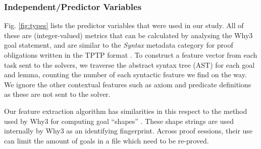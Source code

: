 \subsubsection{Independent/Predictor Variables}
\label{sec:independant}
Fig. \ref{fig:types} lists the predictor variables that were used in our study.  All of these are (integer-valued) metrics that can be calculated by analysing the \textsf{Why3} goal statement, and are similar to the \textit{Syntax} metadata category for proof obligations written in the TPTP format \cite{TPTP}. To construct a feature vector from each task sent to the solvers, we traverse the abstract syntax tree (AST) for each goal and lemma, counting the number of each syntactic feature we find on the way. We ignore the other contextual features such as axiom and predicate definitions as these are not sent to the solver. 

Our feature extraction algorithm has similarities in this respect to the method used by \textsf{Why3} for computing goal ``shapes'' \cite{why:preserving}. These shape strings are used internally by \textsf{Why3} as an identifying fingerprint. Across proof sessions, their use can limit the amount of goals in a file which need to be re-proved.   

